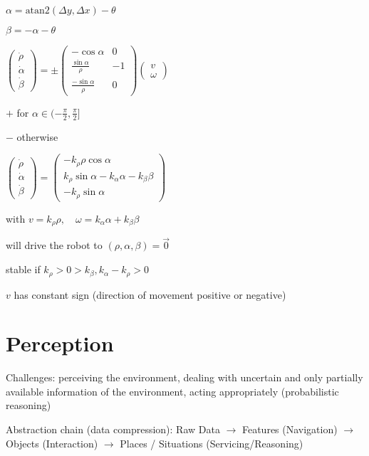 \documentclass[fontsize=6pt]{scrartcl}
\begin{document}
\begin{multicols*}{4}
\begin{minipage}{0.5\columnwidth}
$\alpha= \text{atan2}(\Delta y, \Delta x) - \theta$

$\beta = -\alpha - \theta$

$
\begin{pmatrix}
\dot{\rho}\\
\dot{\alpha}\\
\dot \beta
\end{pmatrix}
=
\pm
\left(
\begin{smallmatrix}
-\cos\alpha & 0\\
\frac{\sin \alpha}{\rho} & -1\\
\frac{-\sin \alpha}{\rho} & 0
\end{smallmatrix}
\right)
\begin{pmatrix}
v\\
\omega
\end{pmatrix}
$

$+$ for $\alpha \in (- \frac{\pi}{2},\frac{\pi}{2}]$

$-$ otherwise

$
\begin{pmatrix}
	\dot{\rho}\\
	\dot{\alpha}\\
	\dot \beta
\end{pmatrix}
=
\left(
\begin{smallmatrix}
-k_\rho \rho \cos\alpha\\
k_\rho \sin \alpha - k_\alpha \alpha - k_\beta \beta\\
-k_\rho \sin \alpha
\end{smallmatrix}
\right)
$

with $v=k_\rho \rho, \quad \omega = k_\alpha \alpha + k_\beta \beta$

will drive the robot to $(\rho, \alpha, \beta) = \vec 0$

stable if $k_\rho > 0 > k_\beta, k_\alpha - k_\rho > 0$
\end{minipage}
$v$ has constant sign (direction of movement positive or negative)

\section*{Perception}

Challenges: perceiving the environment, dealing with uncertain and only partially available information of the environment, acting appropriately (probabilistic reasoning)

Abstraction chain (data compression):
Raw Data $\rightarrow$ Features (Navigation) $\rightarrow$ Objects (Interaction) $\rightarrow$ Places / Situations (Servicing/Reasoning)


\end{multicols*}
\end{document}
